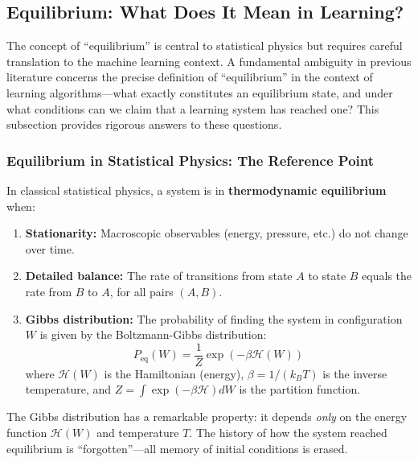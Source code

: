 \documentclass[
  journal=largetwo,
  simfonts=false,
  year=2025,
  volume=37,
]{cup-journal}
\begin{document}
\subsection{Equilibrium: What Does It Mean in Learning?}

The concept of ``equilibrium'' is central to statistical physics but requires careful translation to the machine learning context. A fundamental ambiguity in previous literature concerns the precise definition of ``equilibrium'' in the context of learning algorithms---what exactly constitutes an equilibrium state, and under what conditions can we claim that a learning system has reached one? This subsection provides rigorous answers to these questions.

\subsubsection{Equilibrium in Statistical Physics: The Reference Point}

\begin{definition}\label{def:thermo_equil}
In classical statistical physics, a system is in \textbf{thermodynamic equilibrium} when:
\begin{enumerate}
    \item \textbf{Stationarity:} Macroscopic observables (energy, pressure, etc.) do not change over time.
    \item \textbf{Detailed balance:} The rate of transitions from state $A$ to state $B$ equals the rate from $B$ to $A$, for all pairs $(A, B)$.
    \item \textbf{Gibbs distribution:} The probability of finding the system in configuration $W$ is given by the Boltzmann-Gibbs distribution:
    \begin{equation}\label{eq:gibbs_dist}
        P_{\text{eq}}(W) = \frac{1}{Z} \exp\left( -\beta \mathcal{H}(W) \right)
    \end{equation}
    where $\mathcal{H}(W)$ is the Hamiltonian (energy), $\beta = 1/(k_B T)$ is the inverse temperature, and $Z = \int \exp(-\beta \mathcal{H}) dW$ is the partition function.
\end{enumerate}
\end{definition}

The Gibbs distribution has a remarkable property: it depends \textit{only} on the energy function $\mathcal{H}(W)$ and temperature $T$. The history of how the system reached equilibrium is ``forgotten''---all memory of initial conditions is erased.
\end{document}
